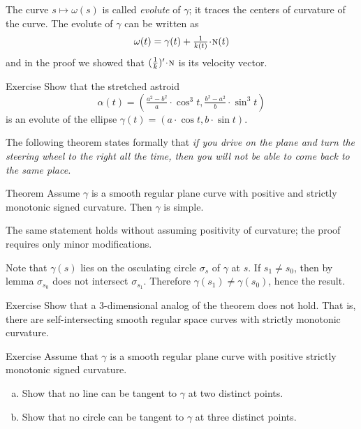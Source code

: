 The curve $s\mapsto \omega(s)$ is called \emph{evolute} of $\gamma$; 
it traces the centers of curvature of the curve. 
The evolute of $\gamma$ can be written as 
\[\omega(t)=\gamma(t)+\tfrac1{\skur(t)}\cdot \norm(t)\] and  
in the proof we showed that $(\tfrac1{\skur})'\cdot\norm$ is its velocity vector.

\begin{thm}{Exercise}\label{ex:evolute-of-ellipse}
Show that the stretched astroid 
\[\alpha(t)=(\tfrac{a^2-b^2}{a}\cdot \cos^3 t,  \tfrac{b^2-a^2}{b}\cdot\sin^3 t)\]
is an evolute of the ellipse $\gamma(t)= (a\cdot \cos t, b\cdot\sin t)$.
\end{thm}



The following theorem states formally that 
\emph{if you drive on the plane and turn the steering wheel to the right all the time,
then you will not be able to come back to the same place.}

\begin{thm}{Theorem}\label{thm:spiral}
Assume $\gamma$ is a smooth regular plane curve with positive and strictly monotonic signed curvature. 
Then $\gamma$ is simple.
\end{thm}

The same statement holds without assuming positivity of curvature; the proof requires only minor modifications.

Note that $\gamma(s)$ lies on the osculating circle $\sigma_s$ of $\gamma$ at $s$.
If $s_1\ne s_0$, then by lemma $\sigma_{s_0}$ does not intersect $\sigma_{s_1}$.
Therefore $\gamma(s_1)\ne \gamma(s_0)$,
hence the result.\qeds

\begin{thm}{Exercise}\label{ex:3D-spiral}
Show that a 3-dimensional analog of the theorem does not hold.
That is, there are self-intersecting smooth regular space curves with strictly monotonic curvature.
\end{thm}

\begin{thm}{Exercise}\label{ex:double-tangent}
Assume that $\gamma$ is a smooth regular plane curve with positive strictly monotonic signed curvature.
\begin{enumerate}[(a)]
\item\label{ex:double-tangent:a}Show that no line can be tangent to $\gamma$ at two distinct points.
\item Show that no circle can be tangent to $\gamma$ at three distinct points. 
\end{enumerate}
\end{thm} %

